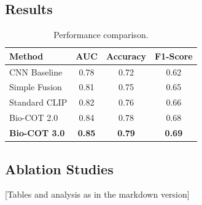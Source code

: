 \documentclass[11pt]{article}
\begin{document}
\subsection{Results}

\begin{table}[h]
\centering
\caption{Performance comparison.}
\label{tab:main_results}
\begin{tabular}{lccc}
\toprule
Method & AUC & Accuracy & F1-Score \\
\midrule
CNN Baseline & 0.78 & 0.72 & 0.62 \\
Simple Fusion & 0.81 & 0.75 & 0.65 \\
Standard CLIP & 0.82 & 0.76 & 0.66 \\
Bio-COT 2.0 & 0.84 & 0.78 & 0.68 \\
\textbf{Bio-COT 3.0} & \textbf{0.85} & \textbf{0.79} & \textbf{0.69} \\
\bottomrule
\end{tabular}
\end{table}

\subsection{Ablation Studies}

[Tables and analysis as in the markdown version]


\end{document}
